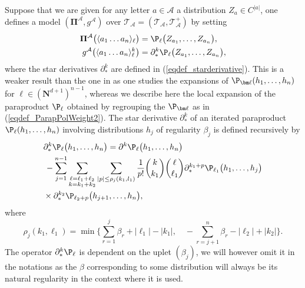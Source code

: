 \documentclass[11pt]{preprint}
\newcommand{\mcA}{\mathcal{A}}
\def\PPi{\boldsymbol{\Pi}}
\def\eqref#1{(\ref{#1})}
\renewcommand{\lg}{\langle}
\newcommand{\rg}{\rangle}
\newcommand{\bfN}{\mathbf{N}}
\newcommand{\scrT}{\mathscr{T}}
\begin{document}
	Suppose that we are given for any letter $a\in \mathcal{A}$ a distribution $Z_a\in C^{|a|}$, one defines a model ${ (\PPi^\mathcal{A},g^\mathcal{A})}$ over $\scrT_\mcA = (\mathcal{T}_{\mathcal{A}}, \mathcal{T}_{\mathcal{A}}^+)$ by setting
	\begin{equation}\label{def_model_words}\begin{split}
			{\PPi}^\mathcal{A}\big( \lg a_1\dots a_n\rg_\ell  \big) &= \P_\ell\big(Z_{a_1},\dots,Z_{a_n}\big),
			\\
			{g}^\mathcal{A}\big( \lg a_1\dots a_n\rg ^k_\ell  \big) &= \partial^k_*\P_\ell\big(Z_{a_1},\dots,Z_{a_n}\big),
	\end{split}\end{equation}
	where the star derivatives $\partial^k_*$ are defined in \eqref{eqdef_starderivative}. This is a weaker result than the one in \cite{LocalExpansionsParacSystems} as one studies the expansions of $\P_{\bm \ell}(h_1,\dots,h_n)$ for ${\bm \ell}\in(\bfN^{d+1})^{n-1}$, whereas we describe here the local expansion of the paraproduct $\P_\ell$ obtained by regrouping the $\P_{\bm \ell}$ as in \eqref{eqdef_ParapPolWeight2}.
	 The star derivative $\partial^k_*$ of an iterated paraproduct $\P_\ell(h_1,\dots,h_n)$ involving distributions $h_j$ of regularity $\beta_j$ is defined recursively by
	\begin{equation}\label{eqdef_starderivative}	\begin{aligned}
			& \partial^k_* \P_\ell\big(h_1,\dots,h_n\big) = \partial^k \P_\ell\big(h_1,\dots,h_n\big)  
			\\
			&\, -
			\sum_{j=1}^{n-1}\sum_{\substack{\ell=\ell_1+\ell_2\\ k=k_1+k_2}}\sum_{|p|\leq \rho_j(k_1,l_1)} \frac{1}{p!}\binom{k}{k_1}\binom{\ell}{\ell_1} \partial^{k_1+p}_* {\P}_{\ell_1}\big(h_1,\dots,h_j\big) 
		\\ & \times\partial^{k_2}_*\P_{\ell_2+p}\big(h_{j+1},\dots,h_n\big),
	\end{aligned}\end{equation}
	where
	\begin{equation}
		\label{condition_sum}
		\rho_j(k_1,\ell_1) = \min \Big\{ \sum_{r=1}^j \beta_r+|\ell_1|-|k_1|, \quad -\sum_{r=j+1}^n\beta_r-|\ell_2|+|k_2|      \Big\} .
	\end{equation}
	The operator $\partial^k_*\P_\ell$ is dependent on the uplet $(\beta_j)$, we will however omit it in the notations as the $\beta$ corresponding to some distribution will always be its natural regularity in the context where it is used.  
\end{document}
